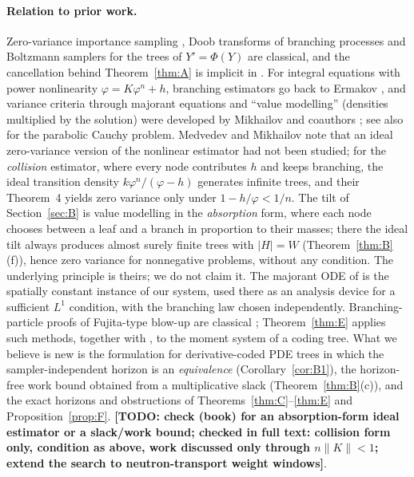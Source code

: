 \documentclass[11pt]{article}
\theoremstyle{definition}
\theoremstyle{remark}
\newcommand{\todo}[1]{\textbf{[TODO: #1]}}
\begin{document}
\paragraph{Relation to prior work.} Zero-variance importance sampling
\cite{KM53}, Doob transforms of branching processes and Boltzmann
samplers for the trees of $Y'=\Phi(Y)$ \cite{BFS92,DFLS04} are classical,
and the cancellation behind Theorem~\ref{thm:A} is implicit in
\cite{HLTT14}. For integral equations with power nonlinearity
$\varphi=K\varphi^n+h$, branching estimators go back to Ermakov
\cite{Ermakov73,EM82}, and variance criteria through majorant equations
and ``value modelling'' (densities multiplied by the solution) were
developed by Mikhailov and coauthors \cite{Mikhailov92,Mikhailov09}; see
also \cite{RRM10} for the parabolic Cauchy problem. Medvedev and Mikhailov
\cite[\S6]{Mikhailov09} note that an ideal zero-variance version of the
nonlinear estimator had not been studied; for the \emph{collision}
estimator, where every node contributes $h$ and keeps branching, the ideal
transition density $k\varphi^n/(\varphi-h)$ generates infinite trees, and
their Theorem~4 yields zero variance only under
$1-h/\varphi<1/n$. The tilt of Section~\ref{sec:B} is value modelling in
the \emph{absorption} form, where each node chooses between a leaf and a
branch in proportion to their masses; there the ideal tilt always
produces almost surely finite trees with $|H|=W$ (Theorem~\ref{thm:B}(f)),
hence zero variance for nonnegative problems, without any condition. The
underlying principle is theirs; we do not claim it. The majorant ODE of \cite[Thm.~3.2]{HLT21} is the
spatially constant instance of our system, used there as an analysis
device for a sufficient $L^1$ condition, with the branching law chosen
independently. Branching-particle proofs of Fujita-type blow-up are
classical \cite{LMW98,CLM08}; Theorem~\ref{thm:E} applies such methods,
together with \cite{EL95}, to the moment system of a coding tree. What
we believe is new is the formulation for derivative-coded PDE trees in
which the sampler-independent horizon is an \emph{equivalence}
(Corollary~\ref{cor:B1}), the horizon-free work bound obtained from a
multiplicative slack (Theorem~\ref{thm:B}(c)), and the exact horizons and
obstructions of Theorems~\ref{thm:C}--\ref{thm:E} and
Proposition~\ref{prop:F}. \todo{check \cite{Mikhailov92} (book) for an
absorption-form ideal estimator or a slack/work bound; \cite{Mikhailov09}
checked in full text: collision form only, condition as above, work
discussed only through $n\|K\|<1$; extend the search to
neutron-transport weight windows}.
\end{document}
